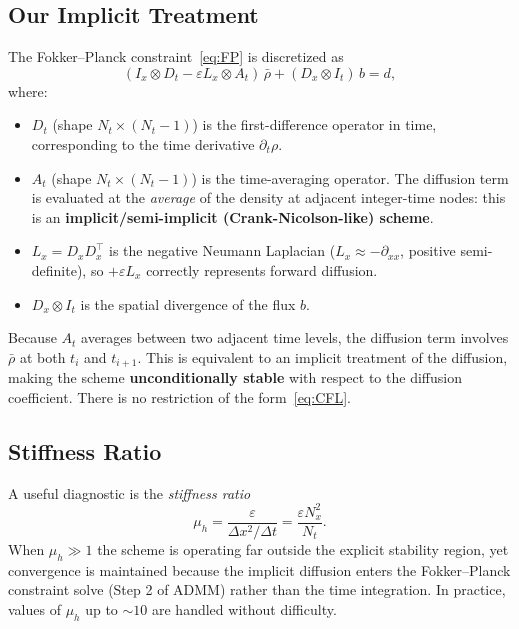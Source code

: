\documentclass[11pt]{article}
\begin{document}
\subsection{Our Implicit Treatment}

The Fokker--Planck constraint~\eqref{eq:FP} is discretized as
\begin{equation}
  (I_x \otimes D_t - \varepsilon L_x \otimes A_t)\,\bar\rho
  + (D_x \otimes I_t)\,b = d,
  \label{eq:discrete_FP}
\end{equation}
where:
\begin{itemize}
  \item $D_t$ (shape $N_t \times (N_t-1)$) is the first-difference operator
        in time, corresponding to the time derivative $\partial_t\rho$.
  \item $A_t$ (shape $N_t \times (N_t-1)$) is the time-averaging operator.
        The diffusion term is evaluated at the \emph{average} of the
        density at adjacent integer-time nodes: this is an
        \textbf{implicit/semi-implicit (Crank-Nicolson-like) scheme}.
  \item $L_x = D_x D_x^\top$ is the negative Neumann Laplacian
        ($L_x \approx -\partial_{xx}$, positive semi-definite), so
        $+\varepsilon L_x$ correctly represents forward diffusion.
  \item $D_x \otimes I_t$ is the spatial divergence of the flux $b$.
\end{itemize}

Because $A_t$ averages between two adjacent time levels, the diffusion term
involves $\bar\rho$ at both $t_i$ and $t_{i+1}$.  This is equivalent to an
implicit treatment of the diffusion, making the scheme
\textbf{unconditionally stable} with respect to the diffusion coefficient.
There is no restriction of the form~\eqref{eq:CFL}.

\subsection{Stiffness Ratio}

A useful diagnostic is the \emph{stiffness ratio}
\begin{equation}
  \mu_h = \frac{\varepsilon}{\Delta x^2 / \Delta t}
        = \frac{\varepsilon N_x^2}{N_t}.
  \label{eq:stiffness}
\end{equation}
When $\mu_h \gg 1$ the scheme is operating far outside the explicit stability
region, yet convergence is maintained because the implicit diffusion enters
the Fokker--Planck constraint solve (Step 2 of ADMM) rather than the time
integration.  In practice, values of $\mu_h$ up to $\sim 10$ are handled
without difficulty.
\end{document}

